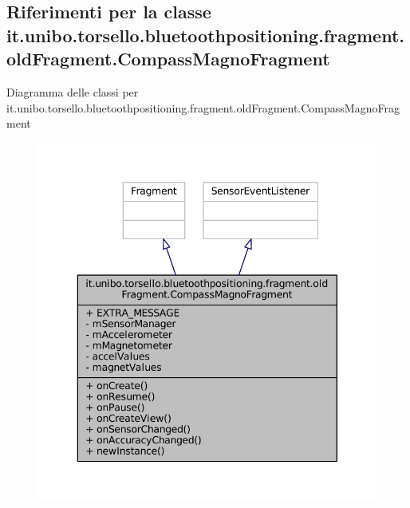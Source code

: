 \hypertarget{classit_1_1unibo_1_1torsello_1_1bluetoothpositioning_1_1fragment_1_1oldFragment_1_1CompassMagnoFragment}{}\subsection{Riferimenti per la classe it.\+unibo.\+torsello.\+bluetoothpositioning.\+fragment.\+old\+Fragment.\+Compass\+Magno\+Fragment}
\label{classit_1_1unibo_1_1torsello_1_1bluetoothpositioning_1_1fragment_1_1oldFragment_1_1CompassMagnoFragment}


Diagramma delle classi per it.\+unibo.\+torsello.\+bluetoothpositioning.\+fragment.\+old\+Fragment.\+Compass\+Magno\+Fragment
\nopagebreak
\begin{figure}[H]
\begin{center}
\leavevmode
\includegraphics[width=343pt]{classit_1_1unibo_1_1torsello_1_1bluetoothpositioning_1_1fragment_1_1oldFragment_1_1CompassMagnoFragment__inherit__graph}
\end{center}
\end{figure}



